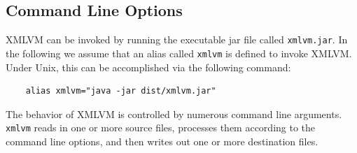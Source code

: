 \documentclass[11pt]{book}
\newcommand{\xmlvm}{\texttt{xmlvm} }
\begin{document}
\subsection{Command Line Options}
\label{SEC_COMMAND_LINE_OPTIONS}

XMLVM can be invoked by running the executable jar file called
\texttt{xmlvm.jar}. In the following we assume that an alias called
\xmlvm is defined to invoke XMLVM. Under Unix, this can be
accomplished via the following command:

\begin{verbatim}
    alias xmlvm="java -jar dist/xmlvm.jar"
\end{verbatim}

The behavior of XMLVM is controlled by numerous command line
arguments. \xmlvm reads in one or more source files, processes them
according to the command line options, and then writes out one or more
destination files.
\end{document}
